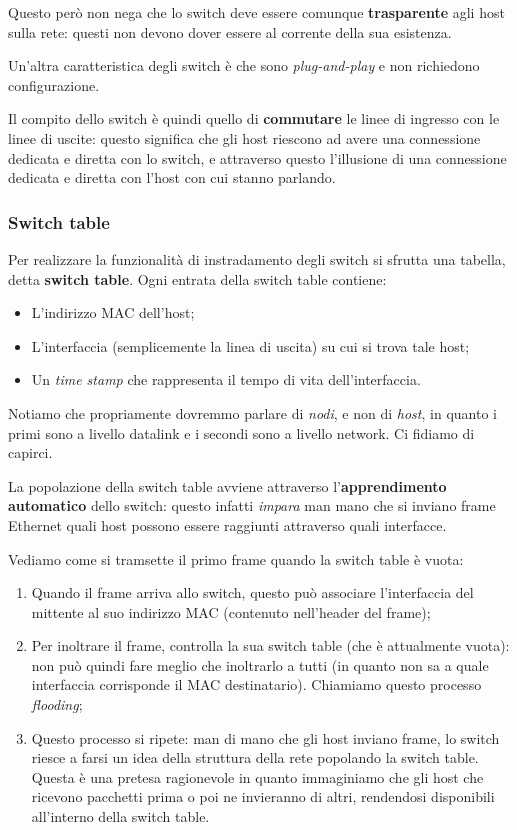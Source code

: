 \documentclass[a4paper,11pt]{article}
\begin{document}
Questo però non nega che lo switch deve essere comunque \textbf{trasparente} agli host sulla rete: questi non devono dover essere al corrente della sua esistenza.

Un'altra caratteristica degli switch è che sono \textit{plug-and-play} e non richiedono configurazione.

\par\smallskip

Il compito dello switch è quindi quello di \textbf{commutare} le linee di ingresso con le linee di uscite: questo significa che gli host riescono ad avere una connessione dedicata e diretta con lo switch, e attraverso questo l'illusione di una connessione dedicata e diretta con l'host con cui stanno parlando.

\subsubsection{Switch table}
Per realizzare la funzionalità di instradamento degli switch si sfrutta una tabella, detta \textbf{switch table}. Ogni entrata della switch table contiene:
\begin{itemize}
	\item L'indirizzo MAC dell'host;
	\item L'interfaccia (semplicemente la linea di uscita) su cui si trova tale host;
	\item Un \textit{time stamp} che rappresenta il tempo di vita dell'interfaccia. 
\end{itemize}

Notiamo che propriamente dovremmo parlare di \textit{nodi}, e non di \textit{host}, in quanto i primi sono a livello datalink e i secondi sono a livello network. Ci fidiamo di capirci.

La popolazione della switch table avviene attraverso l'\textbf{apprendimento automatico} dello switch: questo infatti \textit{impara} man mano che si inviano frame Ethernet quali host possono essere raggiunti attraverso quali interfacce.

Vediamo come si tramsette il primo frame quando la switch table è vuota:
\begin{enumerate}
	\item Quando il frame arriva allo switch, questo può associare l'interfaccia del mittente al suo indirizzo MAC (contenuto nell'header del frame);
	\item Per inoltrare il frame, controlla la sua switch table (che è attualmente vuota): non può quindi fare meglio che inoltrarlo a tutti (in quanto non sa a quale interfaccia corrisponde il MAC destinatario). Chiamiamo questo processo \textit{flooding};
	\item Questo processo si ripete: man di mano che gli host inviano frame, lo switch riesce a farsi un idea della struttura della rete popolando la switch table. Questa è una pretesa ragionevole in quanto immaginiamo che gli host che ricevono pacchetti prima o poi ne invieranno di altri, rendendosi disponibili all'interno della switch table.
\end{enumerate}
\end{document}
